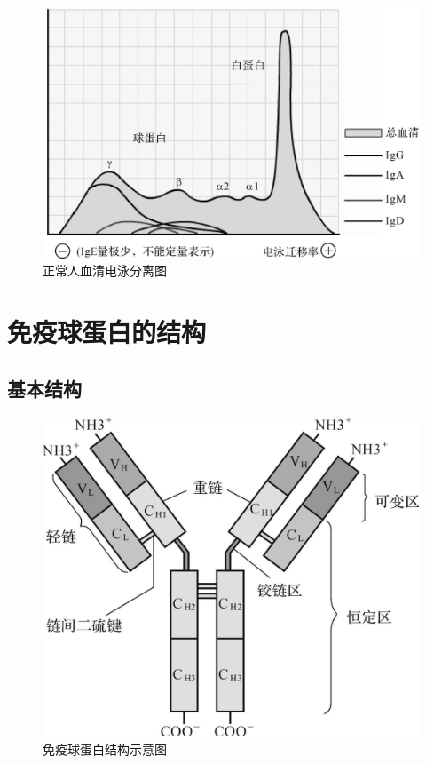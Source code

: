 \begin{figure}[!htbp]
 \centering
 \includegraphics{./images/Image00061.jpg}
 \captionsetup{justification=centering}
 \caption{正常人血清电泳分离图}
 \label{fig4-1}
  \end{figure} 

\section{免疫球蛋白的结构}


\subsection{基本结构}

\begin{figure}[!htbp]
 \centering
 \includegraphics{./images/Image00062.jpg}
 \captionsetup{justification=centering}
 \caption{免疫球蛋白结构示意图}
 \label{fig4-2}
  \end{figure} 

